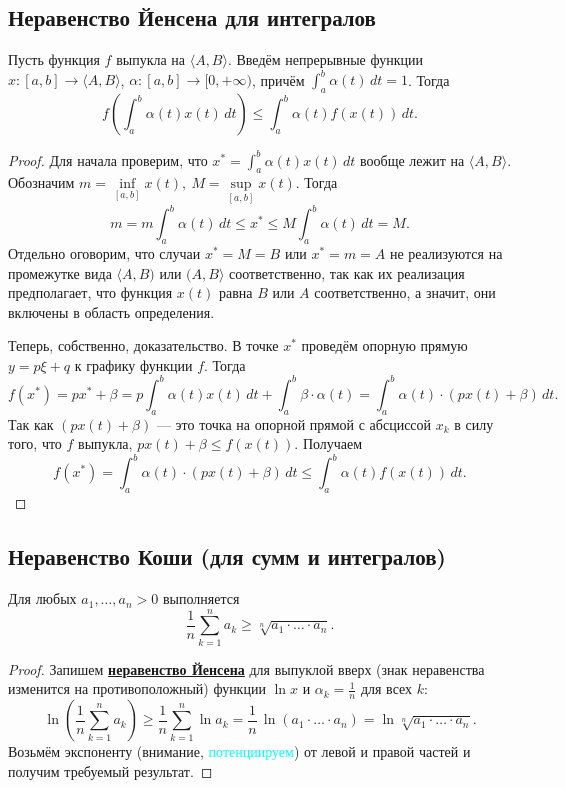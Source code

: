 \subsection{Неравенство Йенсена для интегралов}

\begin{theorem} \hypertarget{Йенсен-интегралы}{}
	Пусть функция \(f\) выпукла на \(\langle A, B \rangle\). Введём непрерывные функции \(x \colon [a, b] \to \langle A, B \rangle\), \(\alpha \colon [a, b] \to [0, +\infty)\), причём \(\int_a^b \alpha(t) \, dt = 1\). Тогда \[
		f \left(\int_a^b \alpha(t) x(t) \, dt \right) \leqslant \int_a^b \alpha(t) f(x(t)) \, dt.
	\]
\end{theorem}
\begin{proof}
	Для начала проверим, что \(x^* = \int_a^b \alpha(t) x(t) \, dt\) вообще лежит на \(\langle A, B \rangle\). Обозначим \(m = \inf\limits_{[a, b]} x(t), \ M = \sup\limits_{[a, b]} x(t)\). Тогда \[
		m = m \int_a^b \alpha(t) \, dt \leqslant x^* \leqslant M \int_a^b \alpha(t) \, dt = M.
	\]
	Отдельно оговорим, что случаи \(x^* = M = B\) или \(x^* = m = A\) не реализуются на промежутке вида  \(\langle A, B)\) или \((A, B \rangle\) соответственно, так как их реализация предполагает, что функция \(x(t)\) равна \(B\) или \(A\) соответственно, а значит, они включены в область определения.
	
	Теперь, собственно, доказательство. В точке \(x^*\) проведём опорную прямую \(y = p \xi + q\) к графику функции \(f\). Тогда \[
		f(x^*) = px^* + \beta = p \int_a^b \alpha(t) x(t) \, dt + \int_a^b \beta \cdot \alpha(t) = \int_a^b \alpha(t) \cdot (p x(t) + \beta) \, dt.
	\]
	Так как \((px(t) + \beta)\) --- это точка на опорной прямой с абсциссой \(x_k\) в силу того, что \(f\) выпукла, \(px(t) + \beta \leqslant f(x(t))\). Получаем \[
		f(x^*) = \int_a^b \alpha(t) \cdot (p x(t) + \beta) \, dt \leqslant \int_a^b \alpha(t) f(x(t)) \, dt.
	\]
\end{proof}

\subsection{Неравенство Коши (для сумм и интегралов)}

\begin{ntheorem}
	Для любых \(a_1, \ldots, a_n > 0\) выполняется \[
		\frac{1}{n} \sum_{k=1}^n a_k \geqslant \sqrt[n]{a_1 \cdot \ldots \cdot a_n}.
	\]
\end{ntheorem}
\begin{proof}
	Запишем \hyperlink{Йенсен-суммы}{\bfseries неравенство Йенсена} для выпуклой вверх (знак неравенства изменится на противоположный) функции \(\ln x\) и \(\alpha_k = \frac{1}{n}\) для всех \(k\): \[
		\ln \left(\frac{1}{n} \sum_{k=1}^n a_k \right) \geqslant \frac{1}{n} \sum_{k=1}^n \ln a_k = \frac{1}{n} \, \ln (a_1 \cdot \ldots \cdot a_n) = \ln \sqrt[n]{a_1 \cdot \ldots \cdot a_n}.
	\]
	Возьмём экспоненту (внимание, \textcolor{cyan}{потенциируем}) от левой и правой частей и получим требуемый результат.
\end{proof}

